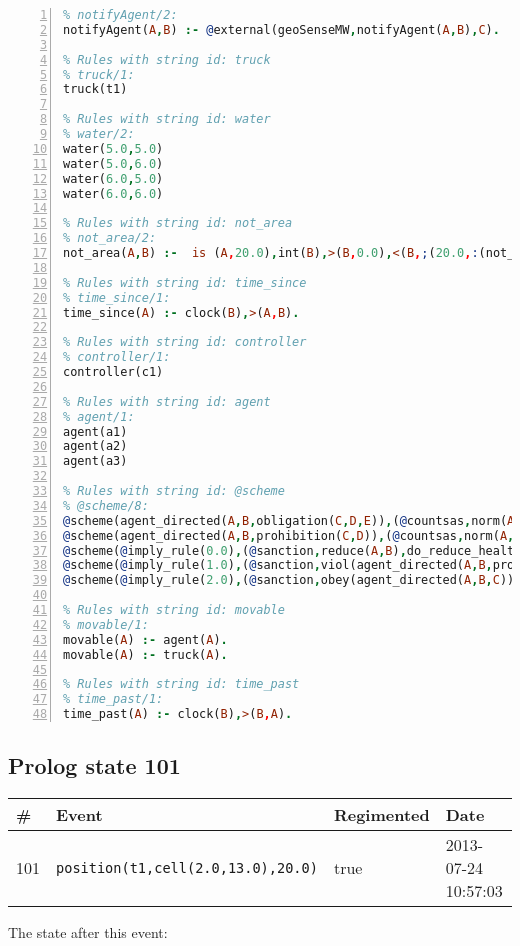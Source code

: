 \documentclass[11pt]{article}\usepackage[utf8]{inputenc}\usepackage{geometry}
\begin{document}
\begin{lstlisting}[language=Prolog, numbers=left]
% Rules with string id: notifyAgent
% notifyAgent/2:
notifyAgent(A,B) :- @external(geoSenseMW,notifyAgent(A,B),C).

% Rules with string id: truck
% truck/1:
truck(t1)

% Rules with string id: water
% water/2:
water(5.0,5.0)
water(5.0,6.0)
water(6.0,5.0)
water(6.0,6.0)

% Rules with string id: not_area
% not_area/2:
not_area(A,B) :-  is (A,20.0),int(B),>(B,0.0),<(B,;(20.0,:(not_area(A,B), is (-(B),20.0)))),int(A),>(A,0.0),<(A,;(20.0,:(area(A,B),-(int(A))))),int(B),>(A,0.0),>(B,0.0),<(A,21.0),<(B,21.0).

% Rules with string id: time_since
% time_since/1:
time_since(A) :- clock(B),>(A,B).

% Rules with string id: controller
% controller/1:
controller(c1)

% Rules with string id: agent
% agent/1:
agent(a1)
agent(a2)
agent(a3)

% Rules with string id: @scheme
% @scheme/8:
@scheme(agent_directed(A,B,obligation(C,D,E)),(@countsas,norm(A,B,F,obligation(C,D,E)),F),false,(listTrue(C)),(time_past(D)),false,[plus(viol(agent_directed(A,B,obligation(C,D,E))))|[]],[plus(obey(agent_directed(A,B,obligation(C,D,E))))|[]])
@scheme(agent_directed(A,B,prohibition(C,D)),(@countsas,norm(A,B,E,prohibition(C,D)),E),(listTrue(C)),false,(false),false,[plus(viol(agent_directed(A,B,prohibition(C,D))))|[]],[plus(obey(agent_directed(A,B,prohibition(C,D))))|[]])
@scheme(@imply_rule(0.0),(@sanction,reduce(A,B),do_reduce_health(A,B),notifyAgent(A,changed(status))),true,false,false,false,[min(reduce(A,B))|[]],[])
@scheme(@imply_rule(1.0),(@sanction,viol(agent_directed(A,B,prohibition(C,D))),do_sanction(D)),true,false,false,false,[min(viol(agent_directed(A,B,prohibition(C,D))))|[]],[])
@scheme(@imply_rule(2.0),(@sanction,obey(agent_directed(A,B,C))),true,false,false,false,[min(obey(agent_directed(A,B,C)))|[]],[])

% Rules with string id: movable
% movable/1:
movable(A) :- agent(A).
movable(A) :- truck(A).

% Rules with string id: time_past
% time_past/1:
time_past(A) :- clock(B),>(B,A).

\end{lstlisting}
\clearpage 
\subsection{Prolog state 101}
\begin{table}[ht]
\centering 
\begin{tabular}{l l l l} 
\textbf{\#} & \textbf{Event} & \textbf{Regimented} & \textbf{Date} \\ [0.5ex] 
\hline
101&\texttt{position(t1,cell(2.0,13.0),20.0)}&true&2013-07-24 10:57:03\\ [1ex] \hline\end{tabular}
\end{table}
The state after this event:
\end{document}
